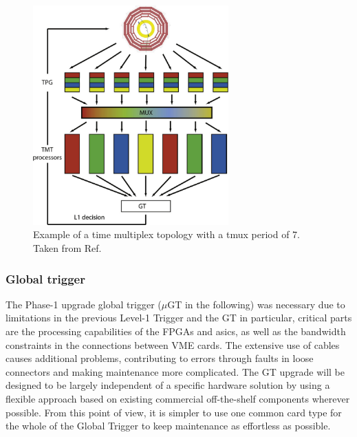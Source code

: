 \documentclass[../../main.tex]{subfiles}
\begin{document}
\begin{figure}[h]
    \centering
    \includegraphics[width=0.67\textwidth]{sections/02/Images/TMUX.png}
    \caption{Example of a time multiplex topology with a \acrshort{tmux} period of 7. Taken from Ref. \cite{TMUX}}
    \label{fig:TMUX}
\end{figure}

\subsubsection{Global trigger}
\label{Phase-1_l1T_arch}

The Phase-1 upgrade global trigger ($\mu$GT in the following) was necessary due to limitations in the previous Level-1 Trigger and the GT in particular, critical parts are the processing capabilities of the FPGAs and \acrshort{asic}s, as well as the bandwidth constraints in the connections between VME cards. The extensive use of cables causes additional problems, contributing to errors through faults in loose connectors and making maintenance more complicated. The GT upgrade will be designed to be largely independent of a specific hardware solution by using a flexible approach based on existing commercial off-the-shelf components wherever possible. From this point of view, it is simpler to use one common card type for the whole of the Global Trigger to keep maintenance as effortless as possible.
\end{document}
